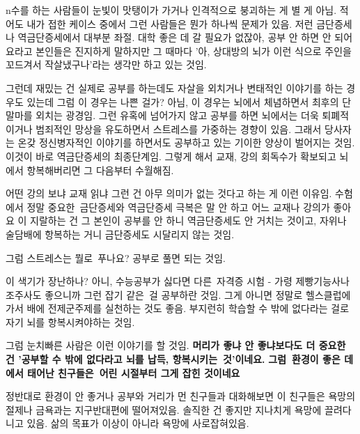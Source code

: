n수를 하는 사람들이 눈빛이 맛탱이가 가거나 인격적으로 붕괴하는 게 별 게 아님.
적어도 내가 접한 케이스 중에서 그런 사람들은 뭔가 하나씩 문제가 있음. 저런 금단증세나 역금단증세에서 대부분 좌절.
대학 좋은 데 갈 필요가 없잖아, 공부 안 하면 안 되어요라고 본인들은 진지하게 말하지만
그 때마다 '아, 상대방의 뇌가 이런 식으로 주인을 꼬드겨서 작살냈구나'라는 생각만 하고 있는 것임.
\vspace{5mm}

그런데 재밌는 건 실제로 공부를 하는데도 자살을 외치거나 변태적인 이야기를 하는 경우도 있는데 그럼 이 경우는 나쁜 걸가?
아님, 이 경우는 뇌에서 체념하면서 최후의 단말마를 외치는 광경임.
그런 유혹에 넘어가지 않고 공부를 하면 뇌에서는 더욱 퇴폐적이거나 범죄적인 망상을 유도하면서 스트레스를 가중하는 경향이 있음.
그래서 당사자는 온갖 정신병자적인 이야기를 하면서도 공부하고 있는 기이한 양상이 벌어지는 것임.
이것이 바로 역금단증세의 최종단계임. 그렇게 해서 교재, 강의 회독수가 확보되고 뇌에서 항복해버리면 그 다음부터 수월해짐.
\vspace{5mm}

어떤 강의 보냐 교재 읽냐 그런 건 아무 의미가 없는 것다고 하는 게 이런 이유임.
수험에서 정말 중요한 금단증세와 역금단증세 극복은 말 안 하고 어느 교재나 강의가 좋아요 이 지랄하는 건
그 본인이 공부를 안 하니 역금단증세도 안 거치는 것이고, 자위나 술담배에 항복하는 거니 금단증세도 시달리지 않는 것임.
\vspace{5mm}

그럼 스트레스는 뭘로 푸나요?
공부로 풀면 되는 것임.
\vspace{5mm}

이 색기가 장난하나?
아니, 수능공부가 싫다면 다른 자격증 시험 - 가령 제빵기능사나 조주사도 좋으니까 그런 잡기 같은 걸 공부하란 것임.
그게 아니면 정말로 헬스클럽에 가서 배에 전제군주제를 실천하는 것도 좋음.
부지런히 학습할 수 밖에 없다라는 걸로 자기 뇌를 항복시켜야하는 것임.
\vspace{5mm}

그럼 눈치빠른 사람은 이런 이야기를 할 것임.
\textbf{머리가 좋냐 안 좋냐보다도 더 중요한 건 '공부할 수 밖에 없다라고 뇌를 납득, 항복시키는 것'이네요.}
\textbf{그럼 환경이 좋은 데에서 태어난 친구들은 어린 시절부터 그게 잡힌 것이네요}
\vspace{5mm}

정반대로 환경이 안 좋거나 공부와 거리가 먼 친구들과 대화해보면 이 친구들은 욕망의 절제나 금욕과는 지구반대편에 떨어져있음.
솔직한 건 좋지만 지나치게 욕망에 끌려다니고 있음. 삶의 목표가 이상이 아니라 욕망에 사로잡혀있음.
\vspace{5mm}

